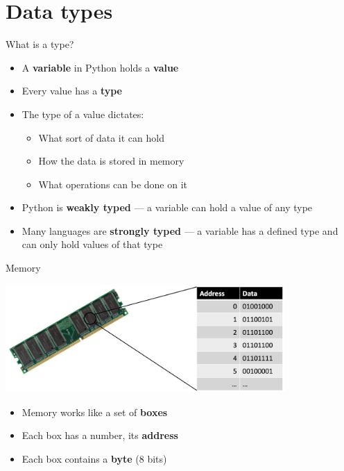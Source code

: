 \part{Data types}
\frame{\partpage}

\begin{frame}{What is a type?}
	\begin{itemize}
		\pause\item A \textbf{variable} in Python holds a \textbf{value}
		\pause\item Every value has a \textbf{type}
		\pause\item The type of a value dictates:
			\begin{itemize}
				\pause\item What sort of data it can hold
				\pause\item How the data is stored in memory
				\pause\item What operations can be done on it
			\end{itemize}
		\pause\item Python is \textbf{weakly typed} --- a variable can hold a value of any type
		\pause\item Many languages are \textbf{strongly typed} --- a variable has a defined type and can only hold values of that type
	\end{itemize}
\end{frame}

\begin{frame}{Memory}
	\pause
	\begin{center}
		\includegraphics[width=0.8\textwidth]{memory}
	\end{center}
	\begin{itemize}
		\item Memory works like a set of \textbf{boxes}
		\pause\item Each box has a number, its \textbf{address}
		\pause\item Each box contains a \textbf{byte} (8 bits)
	\end{itemize}
\end{frame}

